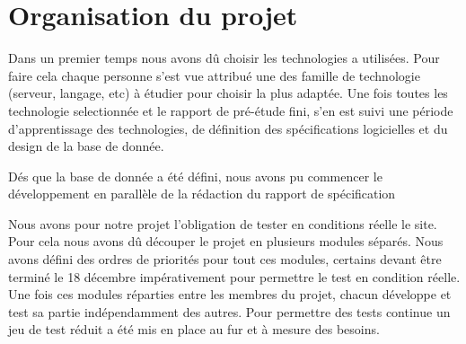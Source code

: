 \chapter{Organisation du projet}

Dans un premier temps nous avons dû choisir les technologies a utilisées. Pour faire cela chaque personne s'est vue attribué une des famille de technologie (serveur, langage, etc) à étudier pour choisir la plus adaptée.
Une fois toutes les technologie selectionnée et le rapport de pré-étude fini, s'en est suivi une période d'apprentissage des technologies, de définition des spécifications logicielles et du design de  la base de donnée.

Dés que la base de donnée a été défini, nous avons pu commencer le développement en parallèle de la rédaction du rapport de spécification

Nous avons pour notre projet l'obligation de tester en conditions réelle le site. Pour cela nous avons dû découper le projet en plusieurs modules séparés. Nous avons défini des ordres de priorités pour tout ces modules, certains devant être terminé le 18 décembre impérativement pour permettre le test en condition réelle.
Une fois ces modules réparties entre les membres du projet, chacun développe et test sa partie indépendamment des autres.
Pour permettre des tests continue un jeu de test réduit a été mis en place au fur et à mesure des besoins.

